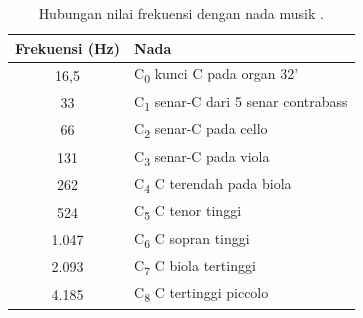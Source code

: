 \begin{table}[b!]
    \centering
    \caption{Hubungan nilai frekuensi dengan nada musik \cite{meyer}.}
    \begin{tabular}{c l}
        \hline
        Frekuensi (Hz) & Nada \\
        \hline
        16,5 & C\textsubscript{0} kunci C pada organ 32' \\
        33 & C\textsubscript{1} senar-C dari 5 senar contrabass \\
        66 & C\textsubscript{2} senar-C pada cello \\
        131 & C\textsubscript{3} senar-C pada viola \\
        262 & C\textsubscript{4} C terendah pada biola \\
        524 & C\textsubscript{5} C tenor tinggi \\
        1.047 & C\textsubscript{6} C sopran tinggi \\
        2.093 & C\textsubscript{7} C biola tertinggi \\
        4.185 & C\textsubscript{8} C tertinggi piccolo \\
        \hline
    \end{tabular}
    \label{tab:frekuensidanNada}
\end{table}

